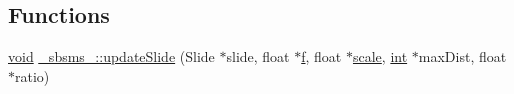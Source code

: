 \subsection*{Functions}
\begin{DoxyCompactItemize}
\item 
\hyperlink{sound_8c_ae35f5844602719cf66324f4de2a658b3}{void} \hyperlink{namespace__sbsms___a22c34a8203a2493a4da4755b67bc46b5}{\+\_\+sbsms\+\_\+\+::update\+Slide} (Slide $\ast$slide, float $\ast$\hyperlink{checksum_8c_ae747d72a1a803f5ff4a4b2602857d93b}{f}, float $\ast$\hyperlink{seqread_8h_a26a42c039941e1d6aa8616c6d7b32541}{scale}, \hyperlink{xmltok_8h_a5a0d4a5641ce434f1d23533f2b2e6653}{int} $\ast$max\+Dist, float $\ast$ratio)
\end{DoxyCompactItemize}
